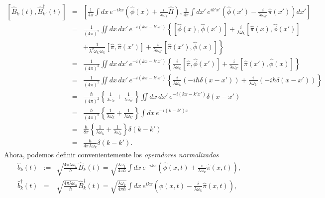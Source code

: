 \begin{eqnarray}
\left[ \hat{B}_k(t) ,\hat{B}_{k'}^\dagger (t) \right] & = &\left[
\frac{1}{4\pi}\int dx\,
e^{-ikx}\left(\hat{\phi}(x)+\frac{i}{\lambda\omega_k}\hat{\Pi}\right)  ,
\frac{1}{4\pi}\int dx'\, e^{ik'x'}\left( \hat{\phi}(x')
-\frac{i}{\lambda\omega_{k'}}\hat{\pi}(x') \right) dx'\right] \\
& = &\frac{1}{\left( 4\pi\right) ^{2}}\iint dx\,dx'\,e^{-i(kx-k'x')}\left\{
\left[\hat{\phi}(x) ,\hat{\phi}(x') \right] +\frac{i}{\lambda\omega_k}\left[
\hat{\pi}(x)
,\hat{\phi}(x') \right] \right.\nonumber\\
&&\left.+\frac{1}{\lambda^{2}\omega_{k'}\omega_k}\left[
\hat{\pi},\hat{\pi}(x') \right] +\frac{i}{\lambda\omega_{k'}}\left[
\hat{\pi}(x') ,\hat{\phi}(x) \right] \right\} \\
& = &\frac{1}{\left( 4\pi\right) ^{2}}\iint dx\,dx'\,e^{-i(kx-k'x')}\left\{
\frac{i}{\lambda\omega_k}\left[ \hat{\pi},\hat{\phi}(x') \right]
+\frac{i}{\lambda\omega_{k'}}\left[ \hat{\pi}(x') ,\hat{\phi}(x) \right] \right\}
\\
& = &\frac{1}{\left( 4\pi\right) ^{2}}\iint dx\,dx'\,e^{-i(kx-k'x')}\left\{
\frac{i}{\lambda\omega_k}\left( -i\hbar\delta(x-x') \right)
+\frac{i}{\lambda\omega_{k'}}\left( -i\hbar\delta(x-x') \right) \right\} \\
& = &\frac{\hbar}{\left( 4\pi\right) ^{2}} \left\{
\frac{1}{\lambda\omega_k}+\frac{1}{\lambda\omega_{k'}}\right\}\iint
dx\,dx'\,e^{-i(kx-k'x')}\delta(x-x') \\
& = &\frac{\hbar}{\left( 4\pi\right) ^{2}} \left\{
\frac{1}{\lambda\omega_k}+\frac{1}{\lambda\omega_{k'}}\right\}\int
dx\,e^{-i(k-k')x} \\
& = &\frac{\hbar}{8\pi}\left\{
\frac{1}{\lambda\omega_k}+\frac{1}{\lambda\omega_k}\right\} \delta(k-k') \\
& = &\frac{\hbar}{4\pi\lambda\omega_k}\delta(k-k') .
\end{eqnarray}
Ahora, podemos definir convenientemente los \textit{operadores normalizados} 
\begin{eqnarray}
\hat{b}_k(t) & := &\sqrt{\frac{4\pi\lambda\omega_k}{\hbar}}\hat{B}_k(t)
=\sqrt{\frac{\lambda\omega_k}{4\pi\hbar}}\int dx\, e^{-ikx}\left(
\hat{\phi}(x,t) +\frac{i}{\lambda\omega_k}\hat{\pi}(x,t) \right)
\label{bk(q,pi)} ,\\
\hat{b}_k^\dagger (t) & =
&\sqrt{\frac{4\pi\lambda\omega_k}{\hbar}}\hat{B}_k^\dagger (t)
=\sqrt{\frac{\lambda\omega_k}{4\pi\hbar}}\int dx\,e^{ikx}\left(
\hat{\phi}(x,t) -\frac{i}{\lambda\omega_k}\hat{\pi}(x,t) \right) \label{bdagk(q,pi)} ,
\end{eqnarray}
